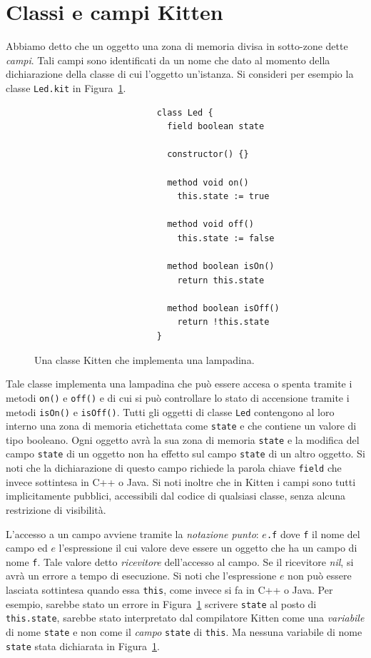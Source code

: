 \section{Classi e campi Kitten}\label{sec:fields}
%
Abbiamo detto che un oggetto \e una zona di memoria divisa in
sotto-zone dette \emph{campi}. Tali campi sono identificati da un nome
che \e dato al momento della dichiarazione della classe di cui l'oggetto
\e un'istanza. Si consideri per esempio la classe \texttt{Led.kit}
in Figura~\ref{fig:led}.
%
\begin{figure}[t]
\begin{verbatim}
                        class Led {
                          field boolean state

                          constructor() {}

                          method void on()
                            this.state := true

                          method void off()
                            this.state := false

                          method boolean isOn()
                            return this.state

                          method boolean isOff()
                            return !this.state
                        }
\end{verbatim}
\caption{Una classe Kitten che implementa una lampadina.}\label{fig:led}
\end{figure}
%
Tale classe implementa una lampadina che pu\`o essere accesa o spenta
tramite i metodi \texttt{on()} e \texttt{off()} e di cui si pu\`o controllare
lo stato di accensione tramite i metodi \texttt{isOn()} e \texttt{isOff()}.
Tutti gli oggetti di classe \texttt{Led} contengono al loro interno
una zona di memoria etichettata come \texttt{state} e che contiene un
valore di tipo booleano. Ogni oggetto avr\`a la sua zona di memoria
\texttt{state} e la modifica del campo \texttt{state} di un oggetto non
ha effetto sul campo \texttt{state} di un altro oggetto.
Si noti che la dichiarazione di questo campo
richiede la parola chiave \texttt{field} che \e invece sottintesa in C++
o Java. Si noti inoltre che in Kitten i campi sono tutti implicitamente
pubblici, \cioe accessibili dal codice di
qualsiasi classe, senza alcuna restrizione di visibilit\`a.

L'accesso a un campo avviene tramite la \emph{notazione punto}: $e$\texttt{.f}
dove \texttt{f} \e il nome del campo ed $e$ \e l'espressione il cui valore
deve essere un oggetto che ha un campo di nome \texttt{f}. Tale valore
\e detto \emph{ricevitore} dell'accesso al campo. Se il ricevitore
\e \textit{nil}, si avr\`a un errore a tempo di esecuzione. Si noti
che l'espressione $e$ non pu\`o essere lasciata sottintesa quando
essa \e \texttt{this}, come invece si fa in C++ o Java. Per esempio,
sarebbe stato un errore in Figura~\ref{fig:led} scrivere \texttt{state}
al posto di \texttt{this.state}, \perche sarebbe stato interpretato dal
compilatore Kitten come una \emph{variabile} di nome \texttt{state} e non
come il \emph{campo} \texttt{state} di \texttt{this}. Ma nessuna variabile
di nome \texttt{state} \e stata dichiarata in Figura~\ref{fig:led}.

